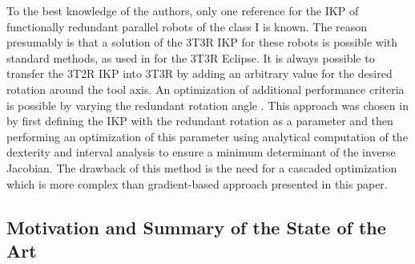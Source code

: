 \documentclass[robotics,article,accept,moreauthors,pdftex]{Definitions/mdpi}
\begin{document}
To the best knowledge of the authors, only one reference \cite{MerletPerDan2000} for the IKP of functionally redundant parallel robots of the class I is known.
The reason presumably is that a solution of the 3T3R IKP for these robots is possible with standard methods, as used in \cite{HongKim2000} for the 3T3R Eclipse.
It is always possible to transfer the 3T2R IKP into 3T3R by adding an arbitrary value for the desired rotation around the tool axis.
An optimization of additional performance criteria is possible by varying the redundant rotation angle \cite{ZhuQuCaoYan2013,GuoDonKe2015}.
This approach was chosen in \cite{MerletPerDan2000} by first defining the IKP with the redundant rotation as a parameter and then performing an optimization of this parameter using analytical computation of the dexterity and interval analysis to ensure a minimum determinant of the inverse Jacobian.
The drawback of this method is the need for a cascaded optimization which is more complex than  gradient-based approach presented in this paper.


\subsection{Motivation and Summary of the State of the Art}
\end{document}
